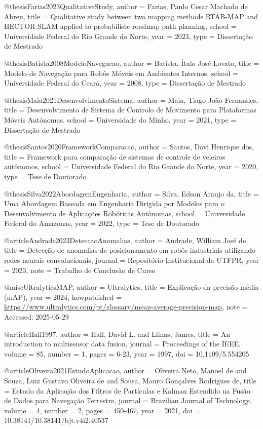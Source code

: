 @thesis{Farias2023QualitativeStudy,
  author = {Farias, Paulo Cesar Machado de Abreu},
  title = {Qualitative study between two mapping methods RTAB-MAP and HECTOR SLAM applied to probabilistc roadmap path planning},
  school = {Universidade Federal do Rio Grande do Norte},
  year = {2023},
  type = {Dissertação de Mestrado}
}

@thesis{Batista2008ModeloNavegacao,
  author = {Batista, Ítalo José Lovato},
  title = {Modelo de Navegação para Robôs Móveis em Ambientes Internos},
  school = {Universidade Federal do Ceará},
  year = {2008},
  type = {Dissertação de Mestrado}
}

@thesis{Maia2021DesenvolvimentoSistema,
  author = {Maia, Tiago João Fernandes},
  title = {Desenvolvimento de Sistema de Controlo de Movimento para Plataformas Móveis Autónomas},
  school = {Universidade do Minho},
  year = {2021},
  type = {Dissertação de Mestrado}
}

@thesis{Santos2020FrameworkComparacao,
  author = {Santos, Davi Henrique dos},
  title = {Framework para comparação de sistemas de controle de veleiros autônomos},
  school = {Universidade Federal do Rio Grande do Norte},
  year = {2020},
  type = {Tese de Doutorado}
}

@thesis{Silva2022AbordagemEngenharia,
  author = {Silva, Edson Araujo da},
  title = {Uma Abordagem Baseada em Engenharia Dirigida por Modelos para o Desenvolvimento de Aplicações Robóticas Autônomas},
  school = {Universidade Federal do Amazonas},
  year = {2022},
  type = {Tese de Doutorado}
}

@article{Andrade2023DeteccaoAnomalias,
  author = {Andrade, William José de},
  title = {Detecção de anomalias de posicionamento em robôs industriais utilizando redes neurais convolucionais},
  journal = {Repositório Institucional da UTFPR},
  year = {2023},
  note = {Trabalho de Conclusão de Curso}
}

@misc{UltralyticsMAP,
  author = {Ultralytics},
  title = {Explicação da precisão média (mAP)},
  year = {2024},
  howpublished = {\url{https://www.ultralytics.com/pt/glossary/mean-average-precision-map}},
  note = {Accessed: 2025-05-29}
}

@article{Hall1997,
  author = {Hall, David L. and Llinas, James},
  title = {An introduction to multisensor data fusion},
  journal = {Proceedings of the IEEE},
  volume = {85},
  number = {1},
  pages = {6-23},
  year = {1997},
  doi = {10.1109/5.554205}
}

@article{Oliveira2021EstudoAplicacao,
  author = {Oliveira Neto, Manoel de and Souza, Luiz Gustavo Oliveira de and Sousa, Mauro Gonçalves Rodrigues de},
  title = {Estudo da Aplicação dos Filtros de Partículas e Kalman Estendido na Fusão de Dados para Navegação Terrestre},
  journal = {Brazilian Journal of Technology},
  volume = {4},
  number = {2},
  pages = {450-467},
  year = {2021},
  doi = {10.38141/10.38141/bjt.v4i2.40537}
}

